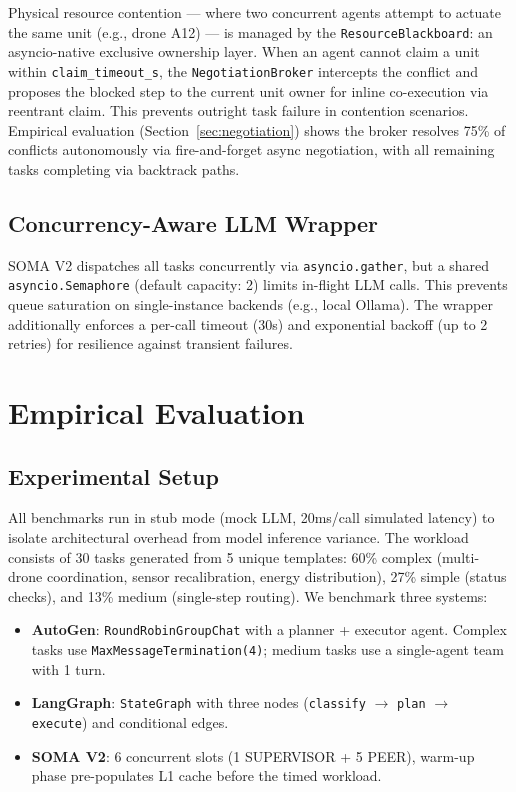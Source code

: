 \documentclass[conference]{IEEEtran}
\begin{document}
Physical resource contention --- where two concurrent agents attempt to actuate the same
unit (e.g., drone A12) --- is managed by the \texttt{ResourceBlackboard}: an asyncio-native
exclusive ownership layer. When an agent cannot claim a unit within \texttt{claim\_timeout\_s},
the \texttt{NegotiationBroker} intercepts the conflict and proposes the blocked step to
the current unit owner for inline co-execution via reentrant claim. This prevents outright
task failure in contention scenarios. Empirical evaluation (Section~\ref{sec:negotiation})
shows the broker resolves 75\% of conflicts autonomously via fire-and-forget async negotiation, with all remaining tasks
completing via backtrack paths.

\subsection{Concurrency-Aware LLM Wrapper}

SOMA V2 dispatches all tasks concurrently via \texttt{asyncio.gather}, but a shared
\texttt{asyncio.Semaphore} (default capacity: 2) limits in-flight LLM calls. This prevents
queue saturation on single-instance backends (e.g., local Ollama). The wrapper additionally
enforces a per-call timeout (30s) and exponential backoff (up to 2 retries) for resilience
against transient failures.


\section{Empirical Evaluation}

\subsection{Experimental Setup}

All benchmarks run in stub mode (mock LLM, 20ms/call simulated latency) to isolate
architectural overhead from model inference variance. The workload consists of 30 tasks
generated from 5 unique templates: 60\% complex (multi-drone coordination, sensor
recalibration, energy distribution), 27\% simple (status checks), and 13\% medium
(single-step routing). We benchmark three systems:

\begin{itemize}
  \item \textbf{AutoGen}: \texttt{RoundRobinGroupChat} with a planner + executor agent.
        Complex tasks use \texttt{MaxMessageTermination(4)}; medium tasks use a single-agent
        team with 1 turn.
  \item \textbf{LangGraph}: \texttt{StateGraph} with three nodes
        (\texttt{classify} $\rightarrow$ \texttt{plan} $\rightarrow$ \texttt{execute}) and
        conditional edges.
  \item \textbf{SOMA V2}: 6 concurrent slots (1 SUPERVISOR + 5 PEER), warm-up phase
        pre-populates L1 cache before the timed workload.
\end{itemize}
\end{document}

